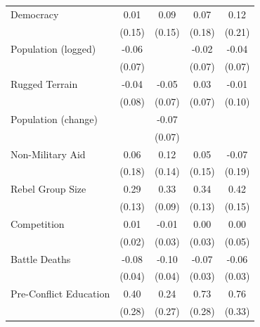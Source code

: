\documentclass[12pt, letterpaper]{article}
\begin{document}
\begin{table}[htbp]
\begin{small}
\begin{tabular}{l*{4}{c}}
Democracy           &        0.01         &        0.09         &        0.07         &        0.12         \\
                    &      (0.15)         &      (0.15)         &      (0.18)         &      (0.21)         \\
Population (logged) &       -0.06         &                     &       -0.02         &       -0.04         \\
                    &      (0.07)         &                     &      (0.07)         &      (0.07)         \\
Rugged Terrain      &       -0.04         &       -0.05         &        0.03         &       -0.01         \\
                    &      (0.08)         &      (0.07)         &      (0.07)         &      (0.10)         \\
Population (change) &                     &       -0.07         &                     &                     \\
                    &                     &      (0.07)         &                     &                     \\
Non-Military Aid    &        0.06         &        0.12         &        0.05         &       -0.07         \\
                    &      (0.18)         &      (0.14)         &      (0.15)         &      (0.19)         \\
Rebel Group Size    &        0.29\sym{**} &        0.33\sym{***}&        0.34\sym{**} &        0.42\sym{***}\\
                    &      (0.13)         &      (0.09)         &      (0.13)         &      (0.15)         \\
Competition         &        0.01         &       -0.01         &        0.00         &        0.00         \\
                    &      (0.02)         &      (0.03)         &      (0.03)         &      (0.05)         \\
Battle Deaths       &       -0.08\sym{*}  &       -0.10\sym{**} &       -0.07\sym{**} &       -0.06\sym{*}  \\
                    &      (0.04)         &      (0.04)         &      (0.03)         &      (0.03)         \\
Pre-Conflict Education&        0.40         &        0.24         &        0.73\sym{**} &        0.76\sym{**} \\
                    &      (0.28)         &      (0.27)         &      (0.28)         &      (0.33)         \\

\end{tabular}
\end{small}
\end{table}
\end{document}
